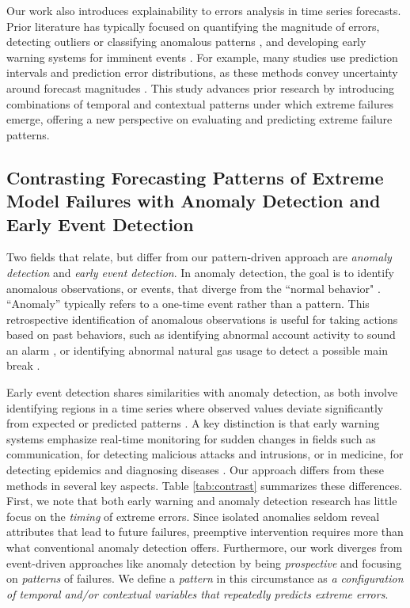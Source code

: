 \documentclass[preprint,12pt]{elsarticle}
\begin{document}
Our work also introduces explainability to errors analysis in time series forecasts. Prior literature has typically focused on quantifying the magnitude of errors, detecting outliers or classifying anomalous patterns \citep{chen2008, kim2020}, and developing early warning systems for imminent events \citep[e.g.,][]{shmueli2010}. For example, many studies use prediction intervals and prediction error distributions, as these methods convey uncertainty around forecast magnitudes \citep{aguirre2018, salem2020}. This study advances prior research by introducing combinations of temporal and contextual patterns under which extreme failures emerge, offering a new perspective on evaluating and predicting extreme failure patterns.

\subsection{Contrasting Forecasting Patterns of Extreme Model Failures with Anomaly Detection and Early Event Detection}\label{sec-contrasting}

Two fields that relate, but differ from our pattern-driven approach are \emph{anomaly detection} and \emph{early event detection}. In anomaly detection, the goal is to identify anomalous observations, or events, that diverge from the ``normal behavior" \citep{chandola2009, nassif2021}. ``Anomaly'' typically refers to a one-time event rather than a pattern. This retrospective identification of anomalous observations is useful for taking actions based on past behaviors, such as identifying abnormal account activity to sound an alarm \citep{patcha2007}, or identifying abnormal natural gas usage to detect a possible main break \citep{akouemo2016}.

Early event detection shares similarities with anomaly detection, as both involve identifying regions in a time series where observed values deviate significantly from expected or predicted patterns \citep{wang2021}. A key distinction is that early warning systems emphasize real-time monitoring for sudden changes in fields such as communication, for detecting malicious attacks and intrusions, or in medicine, for detecting epidemics and diagnosing diseases \citep{deljac2015, shmueli2010}. Our approach differs from these methods in several key aspects. Table \ref{tab:contrast} summarizes these differences. First, we note that both early warning and anomaly detection research has little focus on the \emph{timing} of extreme errors. Since isolated anomalies seldom reveal attributes that lead to future failures, preemptive intervention requires more than what conventional anomaly detection offers. Furthermore, our work diverges from event-driven approaches like anomaly detection by being \emph{prospective} and focusing on \emph{patterns} of failures. We define a \emph{pattern} in this circumstance as \emph{a configuration of temporal and/or contextual variables that repeatedly predicts extreme errors}. 
\end{document}
